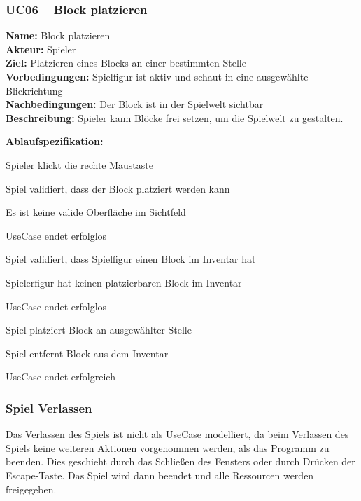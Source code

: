 \documentclass{article}
\begin{document}
\newpage

\subsubsection*{UC06 – Block platzieren}

\textbf{Name:} Block platzieren \\
\textbf{Akteur:} Spieler \\
\textbf{Ziel:} Platzieren eines Blocks an einer bestimmten Stelle \\
\textbf{Vorbedingungen:} Spielfigur ist aktiv und schaut in eine ausgewählte Blickrichtung \\
\textbf{Nachbedingungen:} Der Block ist in der Spielwelt sichtbar \\
\textbf{Beschreibung:} Spieler kann Blöcke frei setzen, um die Spielwelt zu gestalten.

\textbf{Ablaufspezifikation:}
\begin{description}[style=nextline,leftmargin=1.9cm,labelwidth=1.6cm]
  \item[1.] Spieler klickt die rechte Maustaste
  \item[2.] Spiel validiert, dass der Block platziert werden kann
  \item[2a.] Es ist keine valide Oberfläche im Sichtfeld
  \item[2a.1.] UseCase endet erfolglos
  \item[3.] Spiel validiert, dass Spielfigur einen Block im Inventar hat
  \item[3a.] Spielerfigur hat keinen platzierbaren Block im Inventar
  \item[3a.1.] UseCase endet erfolglos
  \item[4.] Spiel platziert Block an ausgewählter Stelle
  \item[5.] Spiel entfernt Block aus dem Inventar
  \item[6.] UseCase endet erfolgreich
\end{description}

\subsubsection*{Spiel Verlassen}

Das Verlassen des Spiels ist nicht als UseCase modelliert, da beim Verlassen des Spiels keine weiteren Aktionen vorgenommen werden, als das Programm zu beenden. Dies geschieht durch das Schlie\ss{}en des Fensters oder durch Drücken der Escape-Taste. Das Spiel wird dann beendet und alle Ressourcen werden freigegeben.
\end{document}
